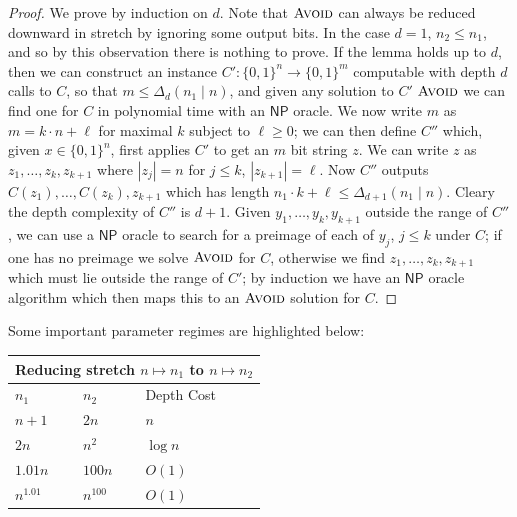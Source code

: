 \documentclass[11pt]{article}
\newcommand{\B}{\{0,1\}}
\newcommand{\avoid}{\textsc{Avoid}}
\begin{document}
\begin{proof}
We prove by induction on $d$. Note that $\avoid$ can always be reduced downward in stretch by ignoring some output bits. In the case $d=1$, $n_2 \leq n_1$, and so by this observation there is nothing to prove. If the lemma holds up to $d$, then we can construct an instance $C': \B^n \to \B^m$ computable with depth $d$ calls to $C$, so that $m \leq \Delta_d(n_1 \mid n)$, and given any solution to $C'$ $\avoid$ we can find one for $C$ in polynomial time with an $\mathsf{NP}$ oracle. We now write $m$ as $m = k \cdot n + \ell$ for maximal $k$ subject to $\ell \geq 0$; we can then define $C''$ which, given $x \in \B^n$, first applies $C'$ to get an $m$ bit string $z$. We can write $z$ as $z_1,\ldots,z_k, z_{k+1}$ where $|z_j| = n$ for $j \leq k$, $|z_{k+1}|=\ell$. Now $C''$ outputs $C(z_1),\ldots,C(z_k),z_{k+1}$ which has length $n_1\cdot k + \ell \leq \Delta_{d+1}(n_1 \mid n)$. Cleary the depth complexity of $C''$ is $d+1$. Given $y_1,\ldots,y_k,y_{k+1}$ outside the range of $C''$, we can use a $\mathsf{NP}$ oracle to search for a preimage of each of $y_j$, $j \leq k$ under $C$; if one has no preimage we solve $\avoid$ for $C$, otherwise we find $z_1,\ldots,z_k, z_{k+1}$ which must lie outside the range of $C'$; by induction we have an $\mathsf{NP}$ oracle algorithm which then maps this to an $\avoid$ solution for $C$.
\end{proof}


Some important parameter regimes are highlighted below:

	\begin{center}
\begin{tabular}{ |p{3cm}|p{3cm}|p{3cm}| }
\hline
\multicolumn{3}{|c|}{Reducing stretch $n \mapsto n_1$ to $n \mapsto n_2$} \\
\hline
$n_1$ & $n_2$ & Depth Cost \\
\hline
$n+1$ & $2n$ & $n$ \\
$2n$ & $n^2$ & $\log n$\\
$1.01n$ & $ 100  n$ & $O(1) $ \\
$n^{1.01}$ & $n^{100}$ & $O(1)$ \\
\hline
\end{tabular}

\end{center}
\end{document}
